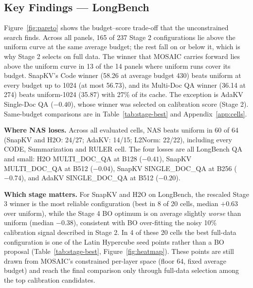 \documentclass[11pt]{article}
\begin{document}
\subsection{Key Findings — LongBench}
\label{sec:which-stage}

Figure~\ref{fig:pareto} shows the budget--score trade-off that the unconstrained search finds. Across all panels, 165 of 237 Stage 2 configurations lie above the uniform curve at the same average budget; the rest fall on or below it, which is why Stage 2 selects on full data. The winner that MOSAIC carries forward lies above the uniform curve in 13 of the 14 panels where uniform runs cover its budget. SnapKV's Code winner (58.26 at average budget 430) beats uniform at every budget up to 1024 (at most 56.73), and its Multi-Doc QA winner (36.14 at 274) beats uniform-1024 (35.87) with 27\% of its cache. The exception is AdaKV Single-Doc QA ($-0.40$), whose winner was selected on calibration score (Stage 2). Same-budget comparisons are in Table~\ref{tab:stage-best} and Appendix~\ref{app:cells}.

\textbf{Where NAS loses.} Across all evaluated cells, NAS beats uniform in 60 of 64 (SnapKV and H2O: 24/27; AdaKV: 14/15; L2Norm: 22/22), including every CODE, Summarization and RULER cell. The four losses are all LongBench QA and small: H2O MULTI\_DOC\_QA at B128 ($-0.41$), SnapKV MULTI\_DOC\_QA at B512 ($-0.04$), SnapKV SINGLE\_DOC\_QA at B256 ($-0.74$), and AdaKV SINGLE\_DOC\_QA at B512 ($-0.20$).

\textbf{Which stage matters.} For SnapKV and H2O on LongBench, the rescaled Stage 3 winner is the most reliable configuration (best in 8 of 20 cells, median $+0.63$ over uniform), while the Stage 4 BO optimum is on average slightly \emph{worse} than uniform (median $-0.38$), consistent with BO over-fitting the noisy 10\% calibration signal described in Stage 2. In 4 of these 20 cells the best full-data configuration is one of the Latin Hypercube seed points rather than a BO proposal (Table~\ref{tab:stage-best}, Figure~\ref{fig:heatmap}). These points are still drawn from MOSAIC's constrained per-layer space (floor 64, fixed average budget) and reach the final comparison only through full-data selection among the top calibration candidates.
\end{document}
